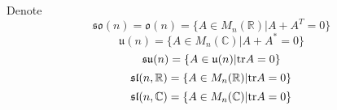 Denote  \[\mathfrak{so}(n)=\mathfrak{o}(n)=\{A\in M_n(\mathbb{R})|A+A^T=0\} \]
\[\mathfrak{u}(n)=\{A\in M_n(\mathbb{C})|A+A^*=0\}\]
\[\mathfrak{su}(n)=\{A\in \mathfrak u(n)|\mathrm{tr} A=0\}\]
\[\mathfrak{sl}(n,\mathbb{R})=\{A\in M_n(\mathbb{R})|\mathrm{tr} A=0\}\]
\[\mathfrak{sl}(n,\mathbb{C})=\{A\in M_n(\mathbb{C})|\mathrm{tr} A=0\}\]
